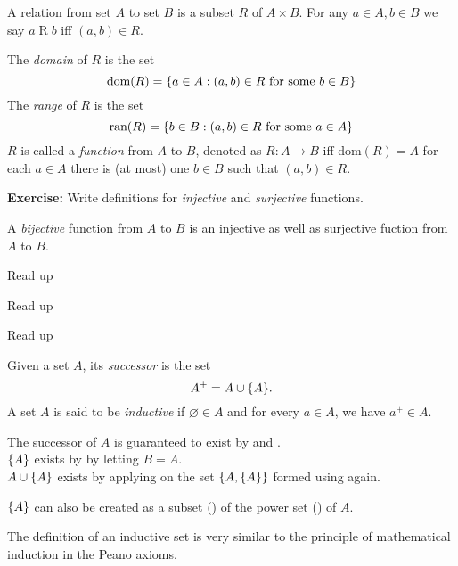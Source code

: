 \begin{defn} \label{defn:relation}
    A relation from set $A$ to set $B$ is a subset $R$ of $A \times B$. For any $a \in A, b \in B$ we say $a\mathrel{R}b$ iff $(a, b) \in R$.
    \begin{outline}
        \1 The \emph{domain} of $R$ is the set
        \[
            \text{dom}(R) = \set{ a \in A : (a, b) \in R \text{ for some } b \in B}
        \]
        \1 The \emph{range} of $R$ is the set
        \[
            \text{ran}(R) = \set{ b \in B : (a, b) \in R \text{ for some } a \in A}
        \]
        \1 $R$ is called a \emph{function} from $A$ to $B$, denoted as $R: A \to B$ iff
            \2 dom$(R) = A$
            \2 for each $a \in A$ there is (at most) one $b \in B$ such that $(a, b) \in R$.
    \end{outline}
\end{defn}

\textbf{Exercise:} Write definitions for \emph{injective} and \emph{surjective} functions.
\begin{rem}
    A \emph{bijective} function from $A$ to $B$ is an injective as well as surjective fuction from $A$ to $B$.
\end{rem}

\begin{axiom} \label{zfc:regularity}
    Read up
\end{axiom}
\begin{axiom} \label{zfc:replacement}
    Read up
\end{axiom}
\begin{axiom} \label{zfc:choice}
    Read up
\end{axiom}

\begin{defn} \label{defn:zfc:inductive}
    Given a set $A$, its \emph{successor} is the set \[
        A^{+} = A \cup \set{A}.
    \] A set $A$ is said to be \emph{inductive} if $\varnothing \in A$ and for every $a \in A$, we have $a^{+} \in A$.
\end{defn}
\begin{rem}
    The successor of $A$ is guaranteed to exist by  and . \\
    $\set{A}$ exists by  by letting $B = A$. \\
    $A \cup \set{A}$ exists by applying  on the set $\set{A, \{A}\}$ formed using  again.

    $\set{A}$ can also be created as a subset () of the power set () of $A$.
\end{rem}
\begin{rem}
    The definition of an inductive set is very similar to the principle of mathematical induction in the Peano axioms.
\end{rem}

